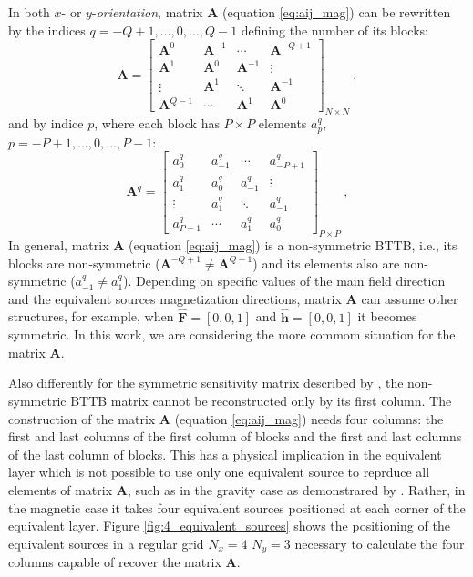 In both $x$- or $y$-\textit{orientation}, matrix $\mathbf{A}$ (equation \ref{eq:aij_mag}) can be rewritten by the indices $q = -Q + 1,...,0,..., Q-1$ defining the number of its blocks:
\begin{equation}
\mathbf{A} = \begin{bmatrix}
\mathbf{A}^{0}   & \mathbf{A}^{-1} & \cdots          & \mathbf{A}^{-Q+1} \\
\mathbf{A}^{1}   & \mathbf{A}^{0}  & \mathbf{A}^{-1} & \vdots           \\ 
\vdots           & \mathbf{A}^{1}  & \ddots          & \mathbf{A}^{-1}   \\
\mathbf{A}^{Q-1} & \cdots          & \mathbf{A}^{1}  & \mathbf{A}^{0}                 
\end{bmatrix}_{N \times N} \: ,
\label{eq:BTTB_A}
\end{equation}
and by indice $p$, where each block has $P \times P$ elements $a^{q}_{p}$, $p = -P + 1,..., 0, \dots, P - 1$:
\begin{equation}
\mathbf{A}^{q} = \begin{bmatrix}
a^{q}_{0}   & a^{q}_{-1} & \cdots     & a^{q}_{-P+1} \\
a^{q}_{1}   & a^{q}_{0}  & a^{q}_{-1} & \vdots           \\ 
\vdots      & a^{q}_{1}  & \ddots     & a^{q}_{-1}   \\
a^{q}_{P-1} & \cdots     & a^{q}_{1}  & a^{q}_{0}                 
\end{bmatrix}_{P \times P} \: ,
\label{eq:Aq_block}
\end{equation}
In general, matrix $\mathbf{A}$ (equation \ref{eq:aij_mag}) is a non-symmetric BTTB, i.e., its blocks are non-symmetric ($\mathbf{A}^{-Q+1} \neq \mathbf{A}^{Q-1} $) and its elements also are non-symmetric ($a^{q}_{-1} \neq a^{q}_{1}$). Depending on specific values of the main field direction and the equivalent sources magnetization directions, matrix $\mathbf{A}$ can assume other structures, for example, when $\hat{\mathbf{F}} = [0, 0, 1]$ and $\hat{\mathbf{h}} = [0, 0, 1]$ it becomes symmetric. In this work, we are considering the more commom situation for the matrix $\mathbf{A}$.

Also differently for the symmetric sensitivity matrix described by \cite{takahashi2020convolutional}, the non-symmetric BTTB matrix cannot be reconstructed only by its first column. The construction of the matrix $\mathbf{A}$ (equation \ref{eq:aij_mag}) needs four columns: the first and last columns of the first column of blocks and the first and last columns of the last column of blocks. This has a physical implication in the equivalent layer which is not possible to use only one equivalent source to reprduce all elements of matrix $\mathbf{A}$, such as in the gravity case as demonstrared by \cite{takahashi2020convolutional}. Rather, in the magnetic case it takes four equivalent sources positioned at each corner of the equivalent layer. Figure \ref{fig:4_equivalent_sources} shows the positioning of the equivalent sources in a regular grid $N_x = 4$ $N_y = 3$ necessary to calculate the four columns capable of recover the matrix $\mathbf{A}$.

